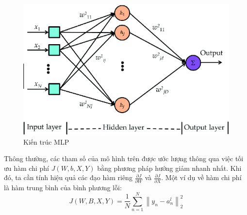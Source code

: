 \documentclass[14pt]{extreport}
\begin{document}
\begin{itemize}
    \begin{figure}[H]
        \begin{center}
            \includegraphics{image/MLP.PNG}
            \caption{Kiến trúc MLP}
            \label{fig:MLP} 
        \end{center}
    \end{figure}
    
    Thông thường, các tham số của mô hình trên được ước lượng thông qua việc tối ưu hàm chi phí $J(W, b, X, Y)$ bằng phương pháp hướng giảm nhanh nhất.
    Khi đó, ta cần tính hiệu quả các đạo hàm riêng $\frac{\partial J}{\partial W}$ và $\frac{\partial J}{\partial X}$.
    Một ví dụ về hàm chi phí là hàm trung bình của bình phương lỗi:
    $$J(W, B, X, Y) = \frac{1}{N} \sum_{n=1}^N \left \| y_n - a_n^l \right \|_2^2 $$
\end{itemize}
\end{document}
